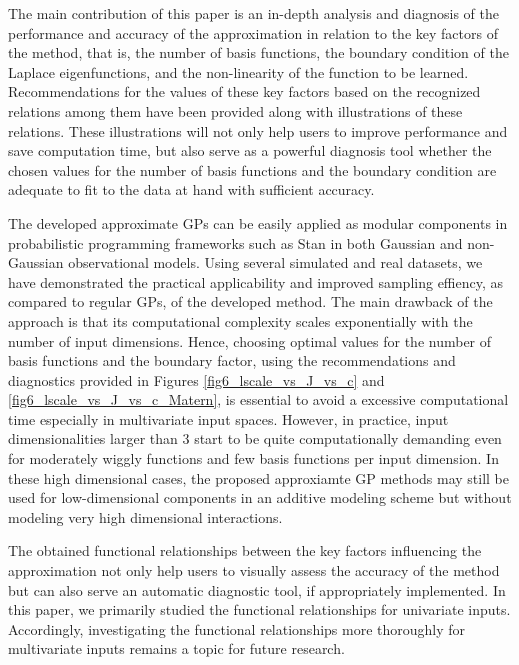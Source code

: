 \documentclass[onecolumn,a4paper,11pt]{article}
\begin{document}

The main contribution of this paper is an in-depth analysis and diagnosis of the performance and accuracy of the approximation in relation to the key factors of the method, that is, the number of basis functions, the boundary condition of the Laplace eigenfunctions, and the non-linearity of the function to be learned. Recommendations for the values of these key factors based on the recognized relations among them have been provided along with illustrations of these relations. These illustrations will not only help users to improve performance and save computation time, but also serve as a powerful diagnosis tool whether the chosen values for the number of basis functions and the boundary condition are adequate to fit to the data at hand with sufficient accuracy.

The developed approximate GPs can be easily applied as modular components in probabilistic programming frameworks such as Stan in both Gaussian and non-Gaussian observational models. Using several simulated and real datasets, we have demonstrated the practical applicability and improved sampling effiency, as compared to regular GPs, of the developed method.
The main drawback of the approach is that its computational complexity scales exponentially with the number of input dimensions. Hence, choosing optimal values for the number of basis functions and the boundary factor, using the
 recommendations and diagnostics provided in Figures \ref{fig6_lscale_vs_J_vs_c} and \ref{fig6_lscale_vs_J_vs_c_Matern}, is essential to avoid a excessive computational time especially in multivariate input spaces. However, in practice, input dimensionalities larger than 3 start to be quite computationally demanding even for moderately wiggly functions and few basis functions per input dimension. In these high dimensional cases, the proposed approxiamte GP methods may still be used for low-dimensional components in an additive modeling scheme but without modeling very high dimensional interactions.

The obtained functional relationships between the key factors influencing the approximation not only help users to visually assess the accuracy of the method
but can also serve an automatic diagnostic tool, if appropriately implemented.
In this paper, we primarily studied the functional relationships for univariate inputs. Accordingly, investigating the functional relationships more thoroughly for multivariate inputs remains a topic for future research. 
\end{document}
